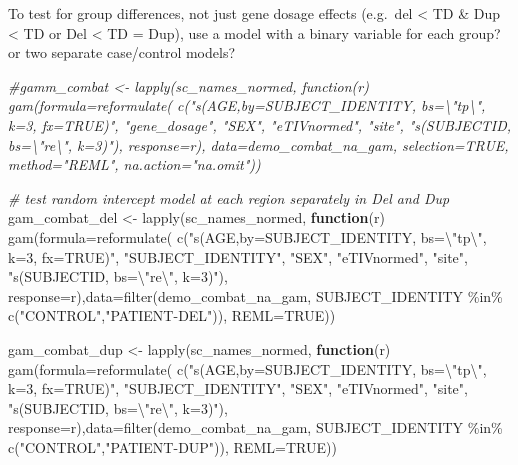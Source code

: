 \documentclass[
]{article}
\newenvironment{Shaded}{\begin{snugshade}}{\end{snugshade}}
\newcommand{\AttributeTok}[1]{\textcolor[rgb]{0.77,0.63,0.00}{#1}}
\newcommand{\CommentTok}[1]{\textcolor[rgb]{0.56,0.35,0.01}{\textit{#1}}}
\newcommand{\ConstantTok}[1]{\textcolor[rgb]{0.00,0.00,0.00}{#1}}
\newcommand{\ControlFlowTok}[1]{\textcolor[rgb]{0.13,0.29,0.53}{\textbf{#1}}}
\newcommand{\FunctionTok}[1]{\textcolor[rgb]{0.00,0.00,0.00}{#1}}
\newcommand{\NormalTok}[1]{#1}
\newcommand{\OtherTok}[1]{\textcolor[rgb]{0.56,0.35,0.01}{#1}}
\newcommand{\SpecialCharTok}[1]{\textcolor[rgb]{0.00,0.00,0.00}{#1}}
\newcommand{\StringTok}[1]{\textcolor[rgb]{0.31,0.60,0.02}{#1}}
\begin{document}
To test for group differences, not just gene dosage effects (e.g.~del
\textless{} TD \& Dup \textless{} TD or Del \textless{} TD = Dup), use a
model with a binary variable for each group? or two separate
case/control models?

\begin{Shaded}
\begin{Highlighting}[]
\CommentTok{\#gamm\_combat \textless{}{-} lapply(sc\_names\_normed, function(r) gam(formula=reformulate( c("s(AGE,by=SUBJECT\_IDENTITY, bs=\textbackslash{}"tp\textbackslash{}", k=3, fx=TRUE)", "gene\_dosage", "SEX", "eTIVnormed", "site", "s(SUBJECTID, bs=\textbackslash{}"re\textbackslash{}", k=3)"), response=r), data=demo\_combat\_na\_gam, selection=TRUE, method="REML", na.action="na.omit"))}

\CommentTok{\# test random intercept model at each region separately in Del and Dup}
\NormalTok{gam\_combat\_del }\OtherTok{\textless{}{-}} \FunctionTok{lapply}\NormalTok{(sc\_names\_normed, }\ControlFlowTok{function}\NormalTok{(r) }\FunctionTok{gam}\NormalTok{(}\AttributeTok{formula=}\FunctionTok{reformulate}\NormalTok{( }\FunctionTok{c}\NormalTok{(}\StringTok{"s(AGE,by=SUBJECT\_IDENTITY, bs=}\SpecialCharTok{\textbackslash{}"}\StringTok{tp}\SpecialCharTok{\textbackslash{}"}\StringTok{, k=3, fx=TRUE)"}\NormalTok{, }\StringTok{"SUBJECT\_IDENTITY"}\NormalTok{, }\StringTok{"SEX"}\NormalTok{, }\StringTok{"eTIVnormed"}\NormalTok{, }\StringTok{"site"}\NormalTok{, }\StringTok{"s(SUBJECTID, bs=}\SpecialCharTok{\textbackslash{}"}\StringTok{re}\SpecialCharTok{\textbackslash{}"}\StringTok{, k=3)"}\NormalTok{), }\AttributeTok{response=}\NormalTok{r),}\AttributeTok{data=}\FunctionTok{filter}\NormalTok{(demo\_combat\_na\_gam, SUBJECT\_IDENTITY }\SpecialCharTok{\%in\%} \FunctionTok{c}\NormalTok{(}\StringTok{"CONTROL"}\NormalTok{,}\StringTok{"PATIENT{-}DEL"}\NormalTok{)), }\AttributeTok{REML=}\ConstantTok{TRUE}\NormalTok{))}

\NormalTok{gam\_combat\_dup }\OtherTok{\textless{}{-}} \FunctionTok{lapply}\NormalTok{(sc\_names\_normed, }\ControlFlowTok{function}\NormalTok{(r) }\FunctionTok{gam}\NormalTok{(}\AttributeTok{formula=}\FunctionTok{reformulate}\NormalTok{( }\FunctionTok{c}\NormalTok{(}\StringTok{"s(AGE,by=SUBJECT\_IDENTITY, bs=}\SpecialCharTok{\textbackslash{}"}\StringTok{tp}\SpecialCharTok{\textbackslash{}"}\StringTok{, k=3, fx=TRUE)"}\NormalTok{, }\StringTok{"SUBJECT\_IDENTITY"}\NormalTok{, }\StringTok{"SEX"}\NormalTok{, }\StringTok{"eTIVnormed"}\NormalTok{, }\StringTok{"site"}\NormalTok{, }\StringTok{"s(SUBJECTID, bs=}\SpecialCharTok{\textbackslash{}"}\StringTok{re}\SpecialCharTok{\textbackslash{}"}\StringTok{, k=3)"}\NormalTok{), }\AttributeTok{response=}\NormalTok{r),}\AttributeTok{data=}\FunctionTok{filter}\NormalTok{(demo\_combat\_na\_gam,  SUBJECT\_IDENTITY }\SpecialCharTok{\%in\%} \FunctionTok{c}\NormalTok{(}\StringTok{"CONTROL"}\NormalTok{,}\StringTok{"PATIENT{-}DUP"}\NormalTok{)), }\AttributeTok{REML=}\ConstantTok{TRUE}\NormalTok{))}


\end{Highlighting}
\end{Shaded}
\end{document}
